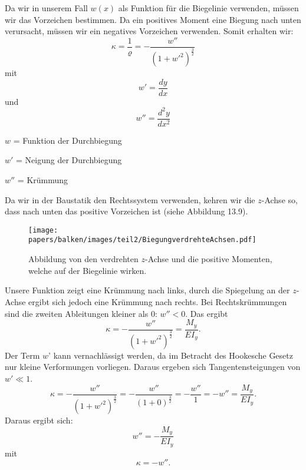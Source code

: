 Da wir in unserem Fall $w(x)$ als Funktion für die Biegelinie verwenden, müssen wir das Vorzeichen bestimmen. Da ein positives Moment eine Biegung nach unten verursacht, müssen wir ein negatives Vorzeichen verwenden. Somit erhalten wir:
\begin{equation*}
	\kappa=
	\frac{1}{\varrho}=
	-\frac{w''}{\left(1+{w'}^2\right)^\frac{3}{2}}
\end{equation*}
mit
\begin{equation*}
	w'=
	\frac{dy}{dx} 
\end{equation*}
und
\begin{equation*}
	w''=
	\frac{d^2y}{dx^2}
\end{equation*}

$w$ = Funktion der Durchbiegung

$w'$ = Neigung der Durchbiegung

$w''$ = Krümmung

Da wir in der Baustatik den Rechtssystem verwenden, kehren wir die $z$-Achse so, dass nach unten das positive Vorzeichen ist (siehe Abbildung 13.9).
\begin{figure}
\centering
	\texttt{[image: papers/balken/images/teil2/BiegungverdrehteAchsen.pdf]}
\caption{Abbildung von den verdrehten $z$-Achse und die positive Momenten, welche auf der Biegelinie wirken.}
\label{fig:Abbildung von den verdrehten $z$-Achse und die positive Momenten, welche auf der Biegelinie wirken.}
\end{figure}

Unsere Funktion zeigt eine Krümmung nach links,
durch die Spiegelung an der $z$-Achse ergibt sich
jedoch eine Krümmung nach rechts.
Bei Rechtskrümmungen sind die zweiten Ableitungen kleiner als 0: $w'' < 0$.
Das ergibt
\begin{equation*}
	\kappa=
	-\frac{w''}{\left(1+{w'}^2\right)^\frac{3}{2}}=
	\frac{M_y}{EI_y}.
\end{equation*}
Der Term $w’$ kann vernachlässigt werden, da im Betracht des Hookesche Gesetz nur kleine Verformungen vorliegen.
Daraus ergeben sich Tangentensteigungen von $w' \ll 1$.
\begin{equation*}
	\kappa=
	-\frac{w''}{\left(1+{w'}^2\right)^\frac{3}{2}}=
	-\frac{w''}{\left(1+0\right)^\frac{3}{2}}=
	-\frac{w''}{1}=-w''=
	\frac{M_y}{EI_y}.
\end{equation*}
Daraus ergibt sich:
\begin{equation*}
	w''=
	-\frac{M_y}{EI_y}
\end{equation*}
mit
\begin{equation*}
	\kappa=
	-w''.
\end{equation*}


